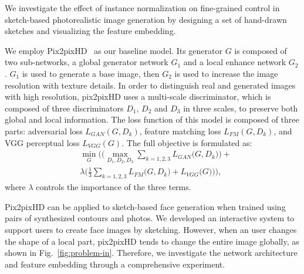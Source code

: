 \documentclass{article}
\newcommand{\dlt}[1]{{}}
\begin{document}
We investigate the effect of instance normalization on fine-grained control in sketch-based photorealistic image generation by designing a set of hand-drawn sketches and visualizing the feature embedding.
\dlt{In Sec.~\ref{sec:pix2pixhd}, we review our baseline method pix2pixHD.
In Sec.~\ref{sec:visualize}, we visualize the feature embedding from hand-drawn sketches by the generator of pix2pixHD, and analyze the visualization results to investigate the effect of instance normalization. 
Based on the analysis, we introduce our design on the generator network for sketch-based face generation in Sec.~\ref{sec:network}.
}

We employ Pix2pixHD~\cite{pix2pixhd} as our baseline model.
Its generator $G$ is composed of two sub-networks, a global generator network $G_1$ and a local enhance network $G_2$. 
$G_1$ is used to generate a base image, then $G_2$ is used to increase the image resolution with texture details. 
In order to distinguish real and generated images with high resolution, pix2pixHD uses a multi-scale discriminator, which is composed of three discriminators $D_1$, $D_2$ and $D_3$ in three scales, to preserve both global and local information. 
The loss function of this model is composed of three parts: adversarial loss $L_{GAN}(G,D_k)$, feature matching loss $L_{FM}(G,D_k)$, and VGG perceptual loss $L_{VGG}(G)$. The full objective is formulated as:
\begin{equation}
\begin{split}
&\underset{G}{\min}\Bigg(\bigg(\underset{D_1,D_2,D_3}{\max} \sum_{k=1,2,3}{L_{GAN}\big(G,D_k\big)}\bigg)+  \\
&\lambda \bigg(\frac{1}{3}\sum_{k=1,2,3}{L_{FM}\big(G,D_k\big)}+L_{VGG}{\big(G\big)}\bigg)\Bigg),
\end{split}
\end{equation}
\noindent
where $\lambda$ controls the importance of the three terms.


Pix2pixHD can be applied to sketch-based face generation when trained using pairs of synthesized contours and photos. 
We developed an interactive system to support users to create face images by sketching. 
However, when an user changes the shape of a local part, pix2pixHD tends to change the entire image globally, as shown in Fig.~\ref{fig:problem-in}.
Therefore, we investigate the network architecture and feature embedding through a comprehensive experiment.
\end{document}
